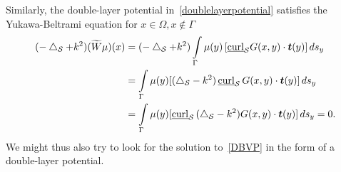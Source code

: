 Similarly, the double-layer potential in~\eqref{doublelayerpotential}
satisfies the Yukawa-Beltrami equation for $x\in \Omega, x\notin\Gamma$
\begin{align*}
  (-\lap_{\S} + k^2)(\widetilde{W}\mu)(x) & = (-\lap_{\S}+k^2)
  \int\limits_\Gamma \mu(y)\, [\underline{\mbox{curl}}_{\S}
  G(x,y)\cdot\vec{t}(y)]\,ds_{y} \\
  &=\int\limits_\Gamma \mu(y)
  [(\lap_{\S}-k^2)\,\underline{\mbox{curl}}_{\S}\,
  G(x,y)\cdot\vec{t}(y)]\,ds_{y} \\ 
  &=\int\limits_\Gamma \mu(y) [\underline{\mbox{curl}}_{\S} \,
  (\lap_{\S} -k^2)G(x,y)\cdot\vec{t}(y)]\,ds_{y} = 0.
\end{align*}
We might thus also try to look for the solution to~\eqref{DBVP} in the
form of a double-layer potential.



